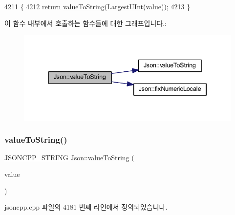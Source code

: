 \begin{DoxyCode}
4211                                          \{
4212   \textcolor{keywordflow}{return} \hyperlink{namespace_json_a498503e8f49d6a3811e3c9f6757da60d}{valueToString}(\hyperlink{namespace_json_ae202ecad69725e23443f465e257456d0}{LargestUInt}(value));
4213 \}
\end{DoxyCode}
이 함수 내부에서 호출하는 함수들에 대한 그래프입니다.\+:\nopagebreak
\begin{figure}[H]
\begin{center}
\leavevmode
\includegraphics[width=334pt]{namespace_json_ab2cb54f173193c8d27c3eb7f10b6e79a_cgraph}
\end{center}
\end{figure}
\mbox{\label{namespace_json_a4732517cb28d203cfd4354d05952a81b}} 
\subsubsection{\texorpdfstring{value\+To\+String()}{valueToString()}\hspace{0.1cm}{\footnotesize\ttfamily [3/6]}}
{\footnotesize\ttfamily \hyperlink{json_8h_a1e723f95759de062585bc4a8fd3fa4be}{J\+S\+O\+N\+C\+P\+P\+\_\+\+S\+T\+R\+I\+NG} Json\+::value\+To\+String (\begin{DoxyParamCaption}\item[{\hyperlink{namespace_json_a218d880af853ce786cd985e82571d297}{Largest\+Int}}]{value }\end{DoxyParamCaption})}



jsoncpp.\+cpp 파일의 4181 번째 라인에서 정의되었습니다.


